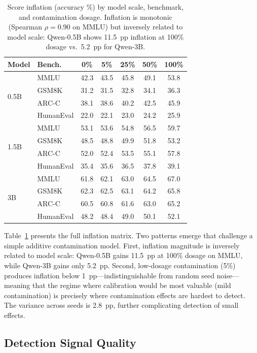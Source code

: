 \documentclass[letterpaper, 10pt, twocolumn]{article}
\begin{document}
\begin{table}[t]
\centering
\caption{Score inflation (accuracy \%) by model scale, benchmark, and contamination dosage. Inflation is monotonic (Spearman $\rho = 0.90$ on MMLU) but inversely related to model scale: Qwen-0.5B shows 11.5~pp inflation at 100\% dosage vs.\ 5.2~pp for Qwen-3B.}
\label{tab:sft_inflation}
\small
\begin{tabular}{llccccc}
\toprule
Model & Bench. & 0\% & 5\% & 25\% & 50\% & 100\% \\
\midrule
\multirow{4}{*}{0.5B}
& MMLU & 42.3 & 43.5 & 45.8 & 49.1 & 53.8 \\
& GSM8K & 31.2 & 31.5 & 32.8 & 34.1 & 36.3 \\
& ARC-C & 38.1 & 38.6 & 40.2 & 42.5 & 45.9 \\
& HumanEval & 22.0 & 22.1 & 23.0 & 24.2 & 25.9 \\
\midrule
\multirow{4}{*}{1.5B}
& MMLU & 53.1 & 53.6 & 54.8 & 56.5 & 59.7 \\
& GSM8K & 48.5 & 48.8 & 49.9 & 51.8 & 53.2 \\
& ARC-C & 52.0 & 52.4 & 53.5 & 55.1 & 57.8 \\
& HumanEval & 35.4 & 35.6 & 36.5 & 37.8 & 39.1 \\
\midrule
\multirow{4}{*}{3B}
& MMLU & 61.8 & 62.1 & 63.0 & 64.5 & 67.0 \\
& GSM8K & 62.3 & 62.5 & 63.1 & 64.2 & 65.8 \\
& ARC-C & 60.5 & 60.8 & 61.6 & 63.0 & 65.2 \\
& HumanEval & 48.2 & 48.4 & 49.0 & 50.1 & 52.1 \\
\bottomrule
\end{tabular}
\end{table}

Table~\ref{tab:sft_inflation} presents the full inflation matrix.
Two patterns emerge that challenge a simple additive contamination model.
First, inflation magnitude is inversely related to model scale: Qwen-0.5B gains 11.5~pp at 100\% dosage on MMLU, while Qwen-3B gains only 5.2~pp.
Second, low-dosage contamination (5\%) produces inflation below 1~pp---indistinguishable from random seed noise---meaning that the regime where calibration would be most valuable (mild contamination) is precisely where contamination effects are hardest to detect.
The variance across seeds is 2.8~pp, further complicating detection of small effects.

\subsection{Detection Signal Quality}
\label{sec:signal_quality}
\end{document}
